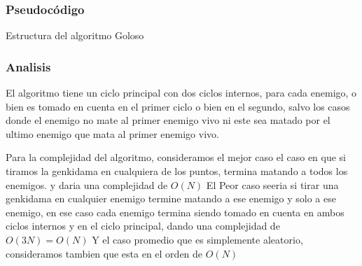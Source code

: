 \subsubsection{Pseudocódigo}
\begin{algorithm}[h!]
\caption{Estructura del algoritmo Goloso}
\begin{algorithmic}[1]
	  \EndWhile

        \EndWhile
	\EndWhile
	\EndFunction
\end{algorithmic}
\end{algorithm}

\subsubsection{Analisis}
El algoritmo tiene un ciclo principal con dos ciclos internos,  para cada enemigo, o bien es tomado en cuenta en el primer ciclo o bien en el segundo, salvo los casos donde el enemigo no mate al primer enemigo vivo ni este sea matado por el ultimo enemigo que mata al primer enemigo vivo.

Para la complejidad del algoritmo, consideramos el mejor caso el caso en que si tiramos la genkidama en cualquiera de los puntos, termina matando a todos los enemigos. y daria una complejidad de $O(N)$
El Peor caso seeria si tirar una genkidama en cualquier enemigo termine matando a ese enemigo y solo a ese enemigo, en ese caso cada enemigo termina siendo tomado en cuenta en ambos ciclos internos y en el ciclo principal, dando una complejidad de $O(3N) = O(N)$
Y el caso promedio que es simplemente aleatorio, consideramos tambien que esta en el orden de $O(N)$